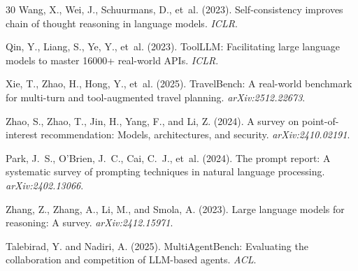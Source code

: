 \documentclass[11pt]{article}
\begin{document}
\begin{thebibliography}{30}
Wang, X., Wei, J., Schuurmans, D., et~al. (2023).
\newblock Self-consistency improves chain of thought reasoning in language models.
\newblock \emph{ICLR}.

Qin, Y., Liang, S., Ye, Y., et~al. (2023).
\newblock ToolLLM: Facilitating large language models to master 16000+ real-world APIs.
\newblock \emph{ICLR}.

Xie, T., Zhao, H., Hong, Y., et~al. (2025).
\newblock TravelBench: A real-world benchmark for multi-turn and tool-augmented travel planning.
\newblock \emph{arXiv:2512.22673}.

Zhao, S., Zhao, T., Jin, H., Yang, F., and Li, Z. (2024).
\newblock A survey on point-of-interest recommendation: Models, architectures, and security.
\newblock \emph{arXiv:2410.02191}.

Park, J.~S., O'Brien, J.~C., Cai, C.~J., et~al. (2024).
\newblock The prompt report: A systematic survey of prompting techniques in natural language processing.
\newblock \emph{arXiv:2402.13066}.

Zhang, Z., Zhang, A., Li, M., and Smola, A. (2023).
\newblock Large language models for reasoning: A survey.
\newblock \emph{arXiv:2412.15971}.

Talebirad, Y. and Nadiri, A. (2025).
\newblock MultiAgentBench: Evaluating the collaboration and competition of LLM-based agents.
\newblock \emph{ACL}.

\end{thebibliography}
\end{document}
